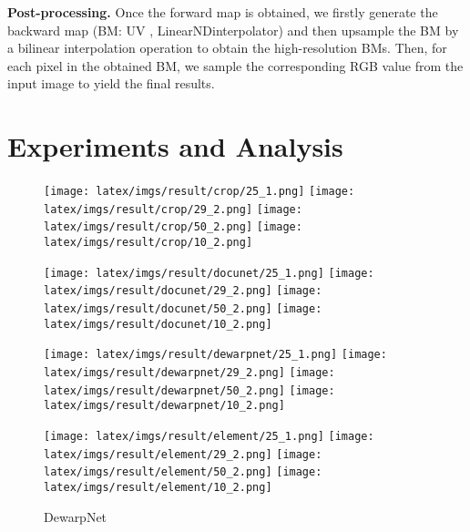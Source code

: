 \documentclass[10pt,twocolumn,letterpaper]{article}
\newcommand{\myparagraph}[1]{\vspace{1pt} \noindent \textbf{#1} }
\begin{document}
\myparagraph{Post-processing.} Once the forward map is obtained, we firstly generate the backward map (BM: UV , LinearNDinterpolator) and then upsample the BM by a bilinear interpolation operation to obtain the high-resolution BMs. Then, for each pixel in the obtained BM, we sample the corresponding RGB value from the input image to yield the final results.

\section{Experiments and Analysis}
\label{sec:exper}


\begin{figure*}[!t]
\centering
\begin{subfigure}[b]{1.0\linewidth}
\centering
    \begin{minipage}[b]{0.16\linewidth}
        \centering
        \texttt{[image: latex/imgs/result/crop/25\_1.png]}
        \texttt{[image: latex/imgs/result/crop/29\_2.png]}
        \texttt{[image: latex/imgs/result/crop/50\_2.png]}
        \texttt{[image: latex/imgs/result/crop/10\_2.png]}
        \caption{Original Image}
    \end{minipage}     
    \begin{minipage}[b]{0.16\linewidth}
        \centering
        \texttt{[image: latex/imgs/result/docunet/25\_1.png]}
        \texttt{[image: latex/imgs/result/docunet/29\_2.png]}
        \texttt{[image: latex/imgs/result/docunet/50\_2.png]}
        \texttt{[image: latex/imgs/result/docunet/10\_2.png]}
        \caption{DocUNet}
    \end{minipage}  
    \begin{minipage}[b]{0.16\linewidth}
        \centering
        \texttt{[image: latex/imgs/result/dewarpnet/25\_1.png]}
        \texttt{[image: latex/imgs/result/dewarpnet/29\_2.png]}
        \texttt{[image: latex/imgs/result/dewarpnet/50\_2.png]}
        \texttt{[image: latex/imgs/result/dewarpnet/10\_2.png]}
        \caption{DewarpNet}
    \end{minipage} 
     \begin{minipage}[b]{0.16\linewidth}
        \centering
        \texttt{[image: latex/imgs/result/element/25\_1.png]}
        \texttt{[image: latex/imgs/result/element/29\_2.png]}
        \texttt{[image: latex/imgs/result/element/50\_2.png]}
        \texttt{[image: latex/imgs/result/element/10\_2.png]}

\end{minipage}
\end{subfigure}
\end{figure*}
\end{document}
